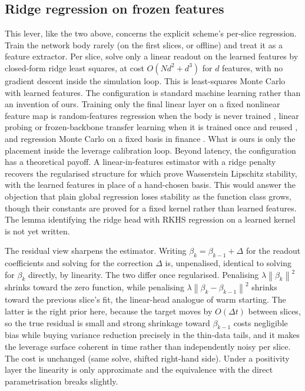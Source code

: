\documentclass[11pt,a4paper]{article}
\theoremstyle{plain}
\theoremstyle{definition}
\theoremstyle{definition}
\newcommand{\norm}[1]{\left\lVert #1 \right\rVert}
\begin{document}
\subsection{Ridge regression on frozen features}

This lever, like the two above, concerns the explicit scheme's per-slice regression. Train the network body rarely (on the first slices, or offline) and treat it as a feature extractor. Per slice, solve only a linear readout on the learned features by closed-form ridge least squares, at cost $O(Nd^2 + d^3)$ for $d$ features, with no gradient descent inside the simulation loop. This is least-squares Monte Carlo with learned features. The configuration is standard machine learning rather than an invention of ours. Training only the final linear layer on a fixed nonlinear feature map is random-features regression when the body is never trained \citep{rahimi2007}, linear probing or frozen-backbone transfer learning when it is trained once and reused \citep{alain2016,yosinski2014}, and regression Monte Carlo on a fixed basis in finance \citep{longstaff2001}. What is ours is only the placement inside the leverage calibration loop. Beyond latency, the configuration has a theoretical payoff. A linear-in-features estimator with a ridge penalty recovers the regularised structure for which \citet{bayer2022rkhs} prove Wasserstein Lipschitz stability, with the learned features in place of a hand-chosen basis. This would answer the objection that plain global regression loses stability as the function class grows, though their constants are proved for a fixed kernel rather than learned features. The lemma identifying the ridge head with RKHS regression on a learned kernel is not yet written.

The residual view sharpens the estimator. Writing $\beta_k = \beta_{k-1} + \Delta$ for the readout coefficients and solving for the correction $\Delta$ is, unpenalised, identical to solving for $\beta_k$ directly, by linearity. The two differ once regularised. Penalising $\lambda\norm{\beta_k}^2$ shrinks toward the zero function, while penalising $\lambda\norm{\beta_k - \beta_{k-1}}^2$ shrinks toward the previous slice's fit, the linear-head analogue of warm starting. The latter is the right prior here, because the target moves by $O(\Delta t)$ between slices, so the true residual is small and strong shrinkage toward $\beta_{k-1}$ costs negligible bias while buying variance reduction precisely in the thin-data tails, and it makes the leverage surface coherent in time rather than independently noisy per slice. The cost is unchanged (same solve, shifted right-hand side). Under a positivity layer the linearity is only approximate and the equivalence with the direct parametrisation breaks slightly.
\end{document}
